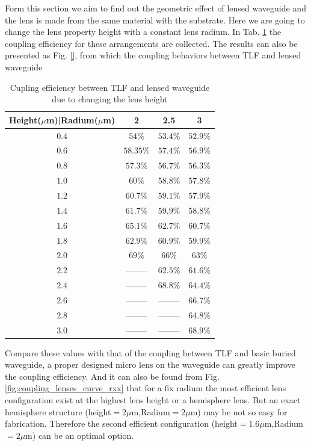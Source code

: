 
Form this section we aim to find out the geometric effect of lensed waveguide and the lens is made from the same material with the substrate. Here we are going to change the lens property height with a constant lens radium. In Tab. \ref{tab:coupling_lensed_waveguide_height} the coupling efficiency for these arrangements are collected. The results can also be presented as Fig. \ref{}, from which the coupling behaviors between TLF and lensed waveguide    
\begin{table}
\caption{Cupling efficiency between TLF and lensed waveguide due to changing the lens height}
\begin{tabular}{|c|c|c|c|}
\hline
Height($\mu$m)|Radium($\mu$m)&	2&	2.5&	3\\
\hline
$0.4$&$54\%$&$53.4\%$&$52.9\%$\\
$0.6$&$58.35\%$&$57.4\%$&$56.9\%$\\
$0.8$&$57.3\%$&$56.7\%$&$56.3\%$\\
$1.0$&$60\%$&$58.8\%$&$57.8\%$\\
$1.2$&$60.7\%$&$59.1\%$&$57.9\%$\\
$1.4$&$61.7\%$&$59.9\%$&$58.8\%$\\
$1.6$&$65.1\%$&$62.7\%$&$60.7\%$\\
$1.8$&$62.9\%$&$60.9\%$&$59.9\%$\\
$2.0$&$69\%$  &  $66\%$&$63\%$\\
$2.2$&--------&$62.5\%$&$61.6\%$\\
$2.4$&--------&$68.8\%$&$64.4\%$\\
$2.6$&--------&--------&$66.7\%$\\
$2.8$&--------&--------&$64.8\%$\\
$3.0$&--------&--------&$68.9\%$\\
\hline

\end{tabular}
\label{tab:coupling_lensed_waveguide_height}
\end{table}
Compare these values with that of the coupling between TLF and basic buried waveguide, a proper designed micro lens on the waveguide can greatly improve the coupling efficiency. And it can also be found from Fig. \ref{fig:coupling_lenses_curve_rxx} that for a fix radium the most efficient lens configuration exist at the highest lens height or a hemisphere lens. But an exact hemisphere structure (height$=2\mu$m,Radium$=2\mu$m) may be not so easy for fabrication. Therefore the second efficient configuration (height$=1.6\mu$m,Radium$=2\mu$m) can be an optimal option. 
